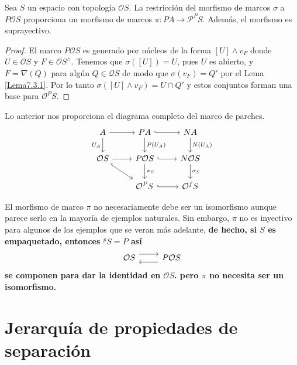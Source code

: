 \begin{lem}\label{Lema7.3.2}
    Sea $S$ un espacio con topología $\mathcal{O}S$. La restricción del morfismo de marcos $\sigma$ a $P\mathcal{O}S$ proporciona un morfismo de marcos $\pi\colon PA\to \mathcal{P}^PS$. Además, el morfismo es suprayectivo.
\end{lem}

\begin{proof}
    El marco $P\mathcal{O}S$ es generado por núcleos de la forma $[U]\wedge v_F$ donde $U\in \mathcal{O}S$ y $F\in \mathcal{O}S^\wedge$. Tenemos que $\sigma([U])=U$, pues $U$ es abierto, y $F=\nabla(Q)$ para algún $Q\in \mathcal{Q}S$ de modo que $\sigma(v_F)=Q'$ por el Lema \ref{Lema7.3.1}. Por lo tanto $\sigma([U]\wedge v_F)=U\cap Q'$ y estos conjuntos forman una base para $\mathcal{O}^PS$.
\end{proof}

Lo anterior nos proporciona el diagrama completo del marco de parches.
\[\begin{tikzcd}
	A & PA & NA \\
	{\mathcal{O}S} & {P\mathcal{O}S} & {N\mathcal{O}S} \\
	& {\mathcal{O}^PS} & {\mathcal{O}^fS}
	\arrow[from=1-1, to=1-2]
	\arrow["{U_A}"', from=1-1, to=2-1]
	\arrow[hook, from=1-2, to=1-3]
	\arrow["{P(U_A)}", from=1-2, to=2-2]
	\arrow["{N(U_A)}", from=1-3, to=2-3]
	\arrow[from=2-1, to=2-2]
	\arrow[hook, from=2-1, to=3-2]
	\arrow[hook, from=2-2, to=2-3]
	\arrow["{\pi_S}", from=2-2, to=3-2]
	\arrow["{\sigma_S}", from=2-3, to=3-3]
	\arrow[hook, from=3-2, to=3-3]
\end{tikzcd}\]

El morfismo de marco $\pi$ no necesariamente debe ser un isomorfismo aunque parece serlo en la mayoría de ejemplos naturales. Sin embargo, $\pi$ no es inyectivo para algunos de los ejemplos que se veran más adelante, \textbf{de hecho, si $S$ es empaquetado, entonces $^pS=P$ así}
\[\begin{tikzcd}
	{\mathcal{O}S} & {P\mathcal{O}S}
	\arrow[shift left=2, from=1-1, to=1-2]
	\arrow[shift left=2, from=1-2, to=1-1]
\end{tikzcd}\]
\textbf{se componen para dar la identidad en $\mathcal{O}S$. pero $\pi$ no necesita ser un isomorfismo.}

\section{Jerarquía de propiedades de separación}\label{Marcos arreglados}

